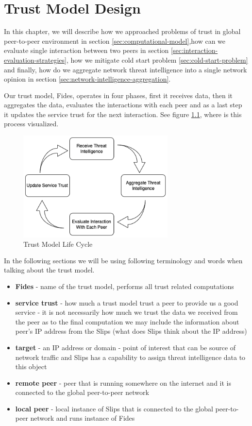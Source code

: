 \chapter{Trust Model Design}
\label{ch:trust-model-design}
In this chapter, we will describe how we approached problems of trust in global peer-to-peer environment in section \ref{sec:computational-model},how can we evaluate single interaction between two peers in section \ref{sec:interaction-evaluation-strategies}, how we mitigate cold start problem \ref{sec:cold-start-problem} and finally, how do we aggregate network threat intelligence into a single network opinion in section \ref{sec:network-intelligence-aggregation}.

Our trust model, Fides, operates in four phases, first it receives data, then it aggregates the data, evaluates the interactions with each peer and as a last step it updates the service trust for the next interaction.
See figure \ref{fig:trust-model-life-cycle}, where is this process visualized.

\begin{figure}[ht!]
    \centering
    \includegraphics[width=0.7\textwidth]{assets/service_trust_diagram.png}
    \caption{Trust Model Life Cycle}
    \label{fig:trust-model-life-cycle}
\end{figure}

In the following sections we will be using following terminology and words when talking about the trust model.

\begin{itemize}
\item \textbf{Fides} - name of the trust model, performs all trust related computations
\item \textbf{service trust} - how much a trust model trust a peer to provide us a good service - it is not necessarily how much we trust the data we received from the peer as to the final computation we may include the information about peer's IP address from the Slips (what does Slips think about the IP address)
\item \textbf{target} - an IP address or domain - point of interest that can be source of network traffic and Slips has a capability to assign threat intelligence data to this object
\item \textbf{remote peer} - peer that is running somewhere on the internet and it is connected to the global peer-to-peer network
\item \textbf{local peer} - local instance of Slips that is connected to the global peer-to-peer network and runs instance of Fides
\end{itemize}

